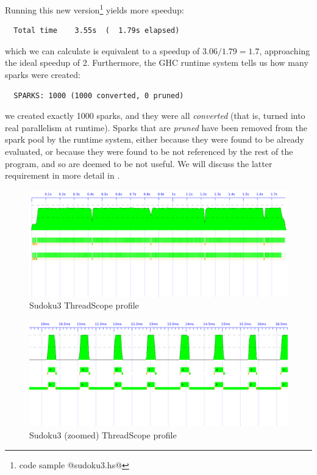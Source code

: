 \noindent Running this new version\footnote{code sample @sudoku3.hs@}
yields more speedup:

{\small \begin{verbatim}
  Total time    3.55s  (  1.79s elapsed)
\end{verbatim}}

\noindent which we can calculate is equivalent to a speedup of
$3.06/1.79 = 1.7$, approaching the ideal speedup of 2.  Furthermore,
the GHC runtime system tells us how many sparks were created:

{\small \begin{verbatim}
  SPARKS: 1000 (1000 converted, 0 pruned)
\end{verbatim}}

\noindent we created exactly 1000 sparks, and they were all
\emph{converted} (that is, turned into real parallelism at runtime).
Sparks that are \emph{pruned} have been removed from the spark pool by
the runtime system, either because they were found to be already
evaluated, or because they were found to be not referenced by the rest
of the program, and so are deemed to be not useful.  We will discuss
the latter requirement in more detail in .

\begin{figure}
\begin{center}
\includegraphics[scale=0.4]{sudoku3.png}
\end{center}
\caption{Sudoku3 ThreadScope profile}
\label{fig:sudoku3-threadscope}
\end{figure}

\begin{figure}
\begin{center}
\includegraphics[scale=0.4]{sudoku3-zoom.png}
\end{center}
\caption{Sudoku3 (zoomed) ThreadScope profile}
\label{fig:sudoku3-zoom-threadscope}
\end{figure}

